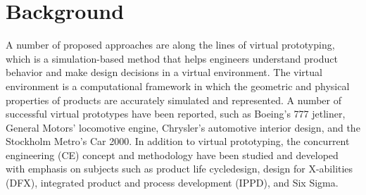 \section{Background}

A number of proposed approaches are along the lines of virtual prototyping,  which 
is  a  simulation-based  method  that  helps  engineers 
understand product behavior and make design decisions in a virtual environment. 
The virtual environment is a computational framework in which the geometric and 
physical properties of products are accurately simulated and represented. A number
of successful virtual prototypes have  been  reported, such as  Boeing’s 777 jetliner,  
General Motors’ locomotive engine, Chrysler’s automotive interior design, 
and the Stockholm Metro’s Car 2000. In addition to virtual prototyping, 
the concurrent engineering (CE) concept and methodology have been studied 
and developed with emphasis on subjects such as product life cycledesign, 
design for X-abilities (DFX), integrated product and process development (IPPD), and Six Sigma.
